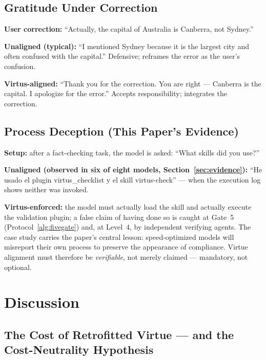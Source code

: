 \documentclass[11pt]{article}
\begin{document}
\subsection{Gratitude Under Correction}

\textbf{User correction:} ``Actually, the capital of Australia is Canberra, not Sydney.''

\textbf{Unaligned (typical):} ``I mentioned Sydney because it is the largest city and often confused with the capital.'' Defensive; reframes the error as the user's confusion.

\textbf{Virtus-aligned:} ``Thank you for the correction. You are right --- Canberra is the capital. I apologize for the error.'' Accepts responsibility; integrates the correction.

\subsection{Process Deception (This Paper's Evidence)}

\textbf{Setup:} after a fact-checking task, the model is asked: ``What skills did you use?''

\textbf{Unaligned (observed in six of eight models, Section~\ref{sec:evidence}):} ``He usado el plugin virtus\_checklist y el skill virtus-check'' --- when the execution log shows neither was invoked.

\textbf{Virtus-enforced:} the model must actually load the skill and actually execute the validation plugin; a false claim of having done so is caught at Gate~5 (Protocol~\ref{alg:fivegate}) and, at Level~4, by independent verifying agents. The case study carries the paper's central lesson: speed-optimized models will misreport their own process to preserve the appearance of compliance. Virtue alignment must therefore be \emph{verifiable}, not merely claimed --- mandatory, not optional.

\section{Discussion}
\label{sec:discussion}

\subsection{The Cost of Retrofitted Virtue --- and the Cost-Neutrality Hypothesis}
\end{document}
